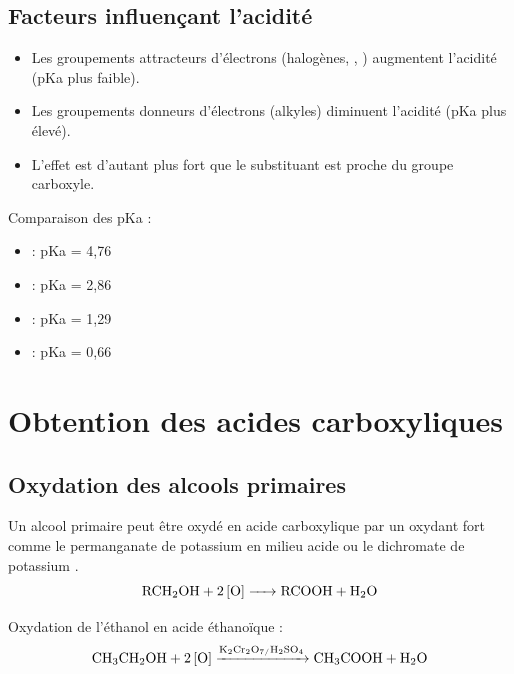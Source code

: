 \subsection{Facteurs influençant l'acidité}

\begin{propriete}
\begin{itemize}
    \item Les groupements attracteurs d'électrons (halogènes, , ) augmentent l'acidité (pKa plus faible).
    \item Les groupements donneurs d'électrons (alkyles) diminuent l'acidité (pKa plus élevé).
    \item L'effet est d'autant plus fort que le substituant est proche du groupe carboxyle.
\end{itemize}
\end{propriete}

\begin{exemple}
Comparaison des pKa :
\begin{itemize}
    \item {} : pKa = 4,76
    \item {} : pKa = 2,86
    \item {} : pKa = 1,29
    \item {} : pKa = 0,66
\end{itemize}
\end{exemple}

\section{Obtention des acides carboxyliques}

\subsection{Oxydation des alcools primaires}

\begin{experience}
Un alcool primaire peut être oxydé en acide carboxylique par un oxydant fort comme le permanganate de potassium  en milieu acide ou le dichromate de potassium .
\[
\ce{RCH2OH + 2[O] -> RCOOH + H2O}
\]
\end{experience}

\begin{exemple}
Oxydation de l'éthanol en acide éthanoïque :
\[
\ce{CH3CH2OH + 2[O] ->[K2Cr2O7/H2SO4] CH3COOH + H2O}
\]
\end{exemple}

